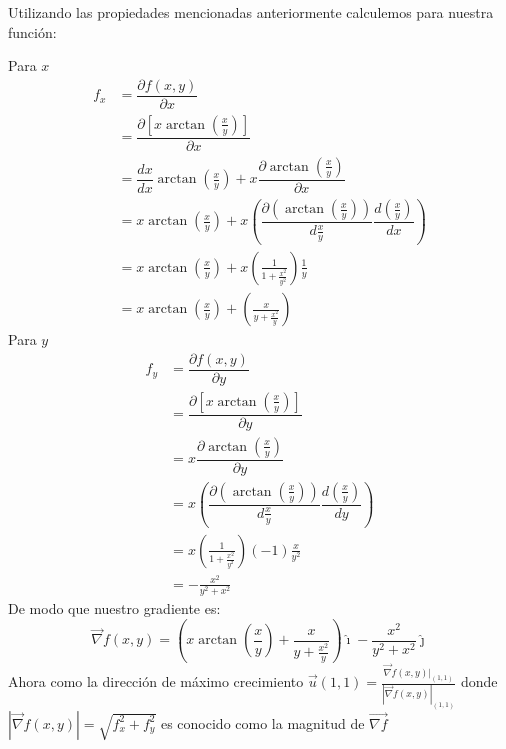         Utilizando las propiedades mencionadas anteriormente calculemos para nuestra función:

        Para $x$
        \begin{equation}
            \begin{split}
                f_x & = \dfrac{\partial f(x, y)}{\partial x} \\
                & = \dfrac{\partial [x \arctan(\frac{x}{y})]}{\partial x} \\
                & = \dfrac{d x}{d x} \arctan(\frac{x}{y}) + x\dfrac{\partial \arctan(\frac{x}{y})}{\partial x} \\
                & = x\arctan(\frac{x}{y}) + x\left(\dfrac{\partial (\arctan(\frac{x}{y}))}{d \frac{x}{y}}\dfrac{d(\frac{x}{y})}{dx} \right) \\
                & = x\arctan(\frac{x}{y}) + x\left(\frac{1}{1 + \frac{x^2}{y^2}}\right) \frac{1}{y}  \\
                & = x\arctan(\frac{x}{y}) + \left(\frac{x}{y + \frac{x^2}{y}}\right)
            \end{split}
            \label{eq:diffx}
        \end{equation}
        Para $y$
        \begin{equation}
            \begin{split}
                f_y & = \dfrac{\partial f(x, y)}{\partial y} \\
                & = \dfrac{\partial [x \arctan(\frac{x}{y})]}{\partial y} \\
                & = x\dfrac{\partial \arctan(\frac{x}{y})}{\partial y} \\
                & = x\left(\dfrac{\partial (\arctan(\frac{x}{y}))}{d \frac{x}{y}}\dfrac{d(\frac{x}{y})}{dy} \right) \\
                & = x\left(\frac{1}{1 + \frac{x^2}{y^2}}\right)(-1) \frac{x}{y^2}  \\
                & = -\frac{x^2}{y^2 + x^2}
            \end{split}
            \label{eq:diffy}
        \end{equation}
        De modo que nuestro gradiente es:
        \begin{equation}
            \vec{\nabla}f(x, y) = \left( x\arctan(\frac{x}{y}) + \frac{x}{y + \frac{x^2}{y}}\right) \hat{\imath} - \frac{x^2}{y^2 + x^2}\hat{\jmath}
        \end{equation}
        Ahora como la dirección de  máximo crecimiento $\vec{u}(1,1) = \frac{\vec{\nabla} f(x, y)|_{(1,1)}}{|\vec{\nabla} f(x, y)|_{(1,1)}}$ donde
        $|\vec{\nabla} f(x, y)| = \sqrt{f_x^2 + f_y^2}$ es conocido como la magnitud de $\vec{\nabla f}$

